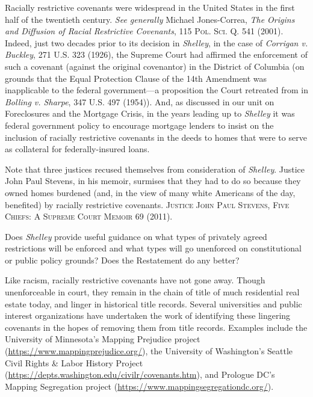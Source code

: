 
\item Racially restrictive covenants were widespread in the United States in the
first half of the twentieth century. \textit{See generally} Michael
Jones-Correa, \textit{The Origins and Diffusion of Racial Restrictive
Covenants}, 115 \textsc{Pol. Sci. Q.} 541 (2001). Indeed, just two decades prior
to its decision in \textit{Shelley}, in the case of \textit{Corrigan v.
Buckley}, 271 U.S. 323 (1926), the Supreme Court had affirmed the enforcement of
such a covenant (against the original covenantor) in the District of Columbia
(on grounds that the Equal Protection Clause of the 14th Amendment was
inapplicable to the federal government---a proposition the Court retreated from
in \textit{Bolling v. Sharpe}, 347 U.S. 497 (1954)). And, as discussed in our
unit on Foreclosures and the Mortgage Crisis, in the years leading up to
\textit{Shelley} it was federal government policy to encourage mortgage lenders
to insist on the inclusion of racially restrictive covenants in the deeds to
homes that were to serve as collateral for federally-insured loans.


Note that three justices recused themselves from consideration of
\textit{Shelley}. Justice John Paul Stevens, in his memoir, surmises that they
had to do so because they owned homes burdened (and, in the view of many white
Americans of the day, benefited) by racially restrictive covenants.
\textsc{Justice John Paul Stevens, Five Chiefs: A Supreme Court Memoir} 69
(2011).



\item Does \textit{Shelley} provide useful guidance on what types of privately
agreed restrictions will be enforced and what types will go unenforced on
constitutional or public policy grounds? Does the Restatement do any better?

\item Like racism, racially restrictive covenants have not gone away. Though
unenforceable in court, they remain in the chain of title of much residential
real estate today, and linger in historical title records. Several universities
and public interest organizations have undertaken the work of identifying these
lingering covenants in the hopes of removing them from title records. Examples
include the University of Minnesota's Mapping Prejudice project
(\url{https://www.mappingprejudice.org/}), the University of Washington's
Seattle Civil Rights \& Labor History Project
(\url{https://depts.washington.edu/civilr/covenants.htm}), and Prologue DC's
Mapping Segregation project (\url{https://www.mappingsegregationdc.org/}). 

